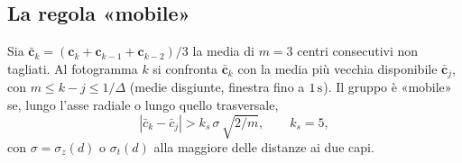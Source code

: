 \subsection{La regola «mobile»}\label{sec:sti-mobile}

\begin{definizione}\label{def:sti-mobile}
Sia $\bar{\mathbf c}_k=(\mathbf c_k+\mathbf c_{k-1}+\mathbf c_{k-2})/3$ la media di $m=3$ centri consecutivi non tagliati. Al fotogramma $k$ si confronta $\bar{\mathbf c}_k$ con la media più vecchia disponibile $\bar{\mathbf c}_j$, con $m\le k-j\le1/\Delta$ (medie disgiunte, finestra fino a $1\,\mathrm{s}$). Il gruppo è «mobile» se, lungo l'asse radiale o lungo quello trasversale,
\begin{equation}\label{eq:sti-soglia}
|\bar c_k-\bar c_j|>k_s\,\sigma\,\sqrt{2/m},\qquad k_s=5,
\end{equation}
con $\sigma=\sigma_z(d)$ o $\sigma_t(d)$ alla maggiore delle distanze ai due capi.
\end{definizione}

